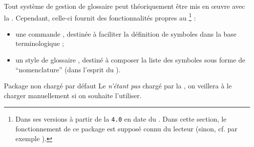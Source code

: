 Tout système de gestion de glossaire peut théoriquement être mis en œuvre avec
la \yatcl. Cependant, celle-ci fournit des fonctionnalités propres au
\footnote{Dans ses versions à partir de la \texttt{4.0} en
  date du . Dans cette section, le fonctionnement de
  ce package est supposé connu du lecteur (sinon, cf. par exemple
  \cite{en-ligne7}).} :
\begin{itemize}
\item une commande , destinée à faciliter la définition de
  symboles dans la base terminologique ;
\item un style de glossaire , destiné à composer la
  liste des symboles sous forme de \enquote{nomenclature} (dans l'esprit du
  ).
\end{itemize}

\begin{dbwarning}{Package  non chargé par défaut}{}
  Le  \emph{n'étant pas} chargé par la \yatcl, on veillera
  à le charger manuellement si on souhaite l'utiliser.
\end{dbwarning}


